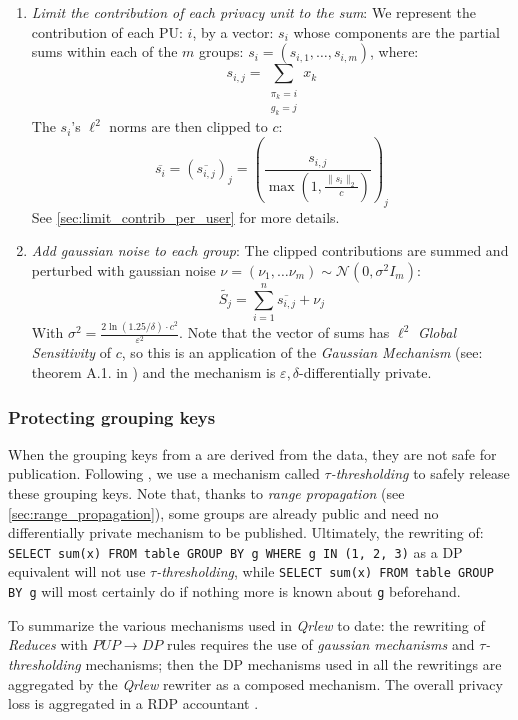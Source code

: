 \documentclass[letterpaper]{article} %
\newcommand{\qrlew}{\emph{Qrlew}}
\begin{document}
\begin{enumerate}
	\item \emph{Limit the contribution of each \emph{privacy unit} to the sum}:
	We represent the contribution of each PU: $i$, by a vector: $s_i$ whose components are the partial sums within each of the $m$ groups: $s_i = \left(s_{i,1},\ldots, s_{i,m}\right)$, where:
    $$s_{i,j} = \sum_{\substack{\pi_k = i\\g_k = j}}x_k$$
    The $s_i$'s $\ell^2$ norms are then clipped to $c$:
    $$\overline{s_i} = \left(\overline{s_{i,j}}\right)_j = \left(\frac{s_{i,j}}{\max\left(1, \frac{\|s_i\|_2}{c}\right)}\right)_j$$
    See \ref{sec:limit_contrib_per_user} for more details.

	\item \emph{Add gaussian noise to each group}:
	The clipped contributions are summed and perturbed with gaussian noise $\nu = \left(\nu_1,\ldots \nu_m\right) \sim \mathcal{N}\left(0, \sigma^2I_m\right)$:
    $$\widetilde{S_j} = \sum_{i=1}^n \overline{s_{i,j}} + \nu_j$$
    With $\sigma^2={\frac {2\ln(1.25/\delta )\cdot c^{2}}{\varepsilon ^{2}}}$.
    Note that the vector of sums has $\ell^2$ \emph{Global Sensitivity} of $c$, so this is an application of the \emph{Gaussian Mechanism} (see: theorem A.1. in \cite{dwork2014algorithmic}) and the mechanism is $\varepsilon, \delta$-differentially private.
\end{enumerate}

\subsubsection{Protecting grouping keys}

When the grouping keys from a are derived from the data, they are not safe for publication.
Following \cite{korolova2009releasing, wilson2019differentially}, we use a mechanism called \emph{$\tau$-thresholding} to safely release these grouping keys.
Note that, thanks to \emph{range propagation} (see \ref{sec:range_propagation}), some groups are already public and need no differentially private mechanism to be published.
Ultimately, the rewriting of: \texttt{SELECT sum(x) FROM table GROUP BY g WHERE g IN (1, 2, 3)} as a DP equivalent will not use \emph{$\tau$-thresholding}, while \texttt{SELECT sum(x) FROM table GROUP BY g} will most certainly do if nothing more is known about \texttt{g} beforehand.

To summarize the various mechanisms used in \qrlew{} to date:
the rewriting of \emph{Reduces} with $PUP \rightarrow DP$ rules requires the use of \emph{gaussian mechanisms} and \emph{$\tau$-thresholding} mechanisms;
then the DP mechanisms used in all the rewritings are aggregated by the \qrlew{} rewriter as a composed mechanism.
The overall privacy loss is aggregated in a RDP accountant \cite{mironov2017renyi}.
\end{document}
